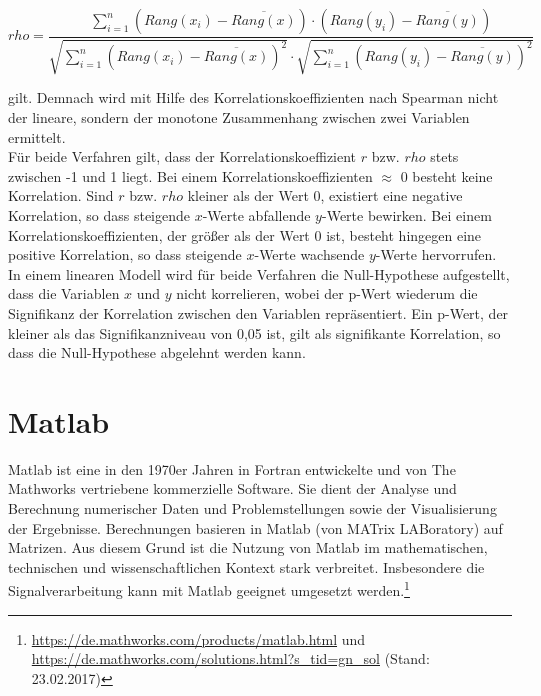 \begin{equation}
rho =  \frac{\sum \limits_{i=1}^n (Rang(x_i)-\overline{Rang(x)}) \cdot (Rang(y_i)-\overline{Rang(y)})}{\sqrt{\sum \limits_{i=1}^n (Rang(x_i)-\overline{Rang(x)})^2} \cdot \sqrt{\sum \limits_{i=1}^n (Rang(y_i)-\overline{Rang(y)})^2}}
	\label{eq:spearman}
\end{equation}

gilt. Demnach wird mit Hilfe des Korrelationskoeffizienten nach Spearman nicht der lineare, sondern der monotone Zusammenhang zwischen zwei Variablen ermittelt. \parencite{frank_einfach_2006}\\

Für beide Verfahren gilt, dass der Korrelationskoeffizient $r$ bzw. $rho$ stets zwischen -1 und 1 liegt. Bei einem Korrelationskoeffizienten $\approx$ 0 besteht keine Korrelation. Sind $r$ bzw. $rho$ kleiner als der Wert 0, existiert eine negative Korrelation, so dass steigende $x$-Werte abfallende $y$-Werte bewirken. Bei einem Korrelationskoeffizienten, der größer als der Wert 0 ist, besteht hingegen eine positive Korrelation, so dass steigende $x$-Werte wachsende $y$-Werte hervorrufen. In einem linearen Modell wird für beide Verfahren die Null-Hypothese aufgestellt, dass die Variablen $x$ und $y$ nicht korrelieren, wobei der p-Wert wiederum die Signifikanz der Korrelation zwischen den Variablen repräsentiert. Ein p-Wert, der kleiner als das Signifikanzniveau von 0,05 ist, gilt als signifikante Korrelation, so dass die Null-Hypothese abgelehnt werden kann. \parencite{frank_einfach_2006}

\section{Matlab}

Matlab ist eine in den 1970er Jahren in Fortran entwickelte und von The Mathworks vertriebene kommerzielle Software. Sie dient der Analyse und Berechnung numerischer Daten und Problemstellungen sowie der Visualisierung der Ergebnisse. Berechnungen basieren in Matlab (von MATrix LABoratory) auf Matrizen. Aus diesem Grund ist die Nutzung von Matlab im mathematischen, technischen und wissenschaftlichen Kontext stark verbreitet. Insbesondere die Signalverarbeitung kann mit Matlab geeignet umgesetzt werden.\footnote{\url{https://de.mathworks.com/products/matlab.html} und \url{https://de.mathworks.com/solutions.html?s_tid=gn_sol} (Stand: 23.02.2017)}\\

